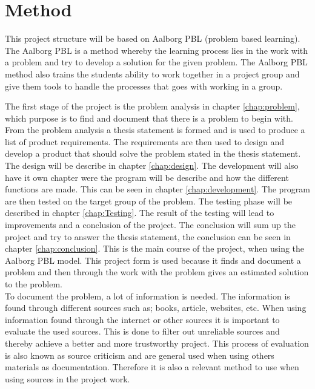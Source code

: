 \section{Method}
This project structure will be based on Aalborg PBL (problem based learning). The Aalborg PBL is a method whereby the learning process lies in the work with a problem and try to develop a solution for the given problem.
The Aalborg PBL method also trains the students ability to work together in a project group and give them tools to handle the processes that goes with working in a group.

The first stage of the project is the problem analysis in chapter \ref{chap:problem}, which purpose is to find and document that there is a problem to begin with. From the problem analysis a thesis statement is formed and is used to produce a list of product requirements.
The requirements are then used to design and develop a product that should solve the problem stated in the thesis statement. The design will be describe in chapter \ref{chap:design}.
The development will also have it own chapter were the program will be describe and how the different functions are made. This can be seen in chapter \ref{chap:development}.
The program are then tested on the target group of the problem. The testing phase will be described in chapter \ref{chap:Testing}. The result of the testing will lead to improvements and a conclusion of the project. The conclusion will sum up the project and try to answer the thesis statement, the conclusion can be seen in chapter \ref{chap:conclusion}. This is the main course of the project, when using the Aalborg PBL model.
This project form is used because it finds and document a problem and then through the work with the problem gives an estimated solution to the problem.\\

To document the problem, a lot of information is needed. The information is found through different sources such as; books, article, websites, etc. When using information found through the internet or other sources it is important to evaluate the used sources.
This is done to filter out unreliable sources and thereby achieve a better and more trustworthy project.
This process of evaluation is also known as source criticism and are general used when using others materials as documentation. Therefore it is also a relevant method to use when using sources in the project work.\\